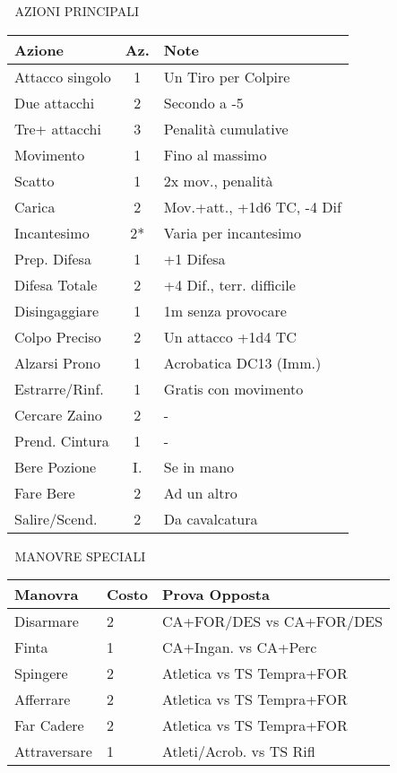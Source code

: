 \documentclass[10pt,a4paper,landscape]{article}
\begin{document}
\begin{multicols}{4}
		\begin{mainsection}{📜 AZIONI PRINCIPALI}
			{\small
				\begin{tabular}{@{}p{2cm}cp{3cm}@{}}
					\toprule
					\textbf{Azione} & \textbf{Az.} & \textbf{Note} \\
					\midrule
					Attacco singolo & 1 & Un Tiro per Colpire \\
					Due attacchi & 2 & Secondo a -5 \\
					Tre+ attacchi & 3 & Penalità cumulative \\
					\midrule
					Movimento & 1 & Fino al massimo \\
					Scatto & 1 & 2x mov., penalità \\
					Carica & 2 & Mov.+att., +1d6 TC, -4 Dif \\
					\midrule
					Incantesimo & 2* & Varia per incantesimo \\
					Prep. Difesa & 1 & +1 Difesa \\
					Difesa Totale & 2 & +4 Dif., terr. difficile \\
					Disingaggiare & 1 & 1m senza provocare \\
					Colpo Preciso & 2 & Un attacco +1d4 TC \\
					\midrule
					Alzarsi Prono & 1 & Acrobatica DC13 (Imm.) \\
					Estrarre/Rinf. & 1 & Gratis con movimento \\
					Cercare Zaino & 2 & - \\
					Prend. Cintura & 1 & - \\
					\midrule
					Bere Pozione & I. & Se in mano \\
					Fare Bere & 2 & Ad un altro \\
					Salire/Scend. & 2 & Da cavalcatura \\
					\bottomrule
				\end{tabular}
			}
		\end{mainsection}
		
		\begin{mainsection}{🤺 MANOVRE SPECIALI}
			\begin{tabular}{@{}p{1.7cm}p{0.8cm}p{3cm}@{}}
				\toprule
				\textbf{Manovra} & \textbf{Costo} & \textbf{Prova Opposta} \\
				\midrule
				Disarmare & 2 & CA+FOR/DES vs CA+FOR/DES \\
				Finta & 1 & CA+Ingan. vs CA+Perc \\
				Spingere & 2 & Atletica vs TS Tempra+FOR \\
				Afferrare & 2 & Atletica vs TS Tempra+FOR \\
				Far Cadere & 2 & Atletica vs TS Tempra+FOR \\
				Attraversare & 1 & Atleti/Acrob. vs TS Rifl \\
				\bottomrule
			\end{tabular}
			

\end{mainsection}
\end{multicols}
\end{document}
